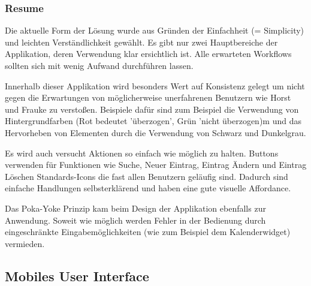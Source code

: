 \subsubsection{Resume}

Die aktuelle Form der L\"osung wurde aus Gründen der Einfachheit (= Simplicity) und leichten Verst\"andlichkeit gew\"ahlt.
Es gibt nur zwei Hauptbereiche der Applikation, deren Verwendung klar ersichtlich ist.
Alle erwarteten Workflows sollten sich mit wenig Aufwand durchf\"uhren lassen.

Innerhalb dieser Applikation wird besonders Wert auf Konsistenz gelegt um nicht gegen die Erwartungen
von m\"oglicherweise unerfahrenen Benutzern wie Horst und Frauke zu versto\ss en. Beispiele daf\"ur sind
zum Beispiel die Verwendung von Hintergrundfarben (Rot bedeutet '\"uberzogen', Gr\"un 'nicht \"uberzogen)m
und das Hervorheben von Elementen durch die Verwendung von Schwarz und Dunkelgrau.

Es wird auch versucht Aktionen so einfach wie m\"oglich zu halten. Buttons verwenden f\"ur Funktionen wie
Suche, Neuer Eintrag, Eintrag \"Andern und Eintrag L\"oschen Standards-Icons die fast allen Benutzern gel\"aufig sind.
Dadurch sind einfache Handlungen selbsterkl\"arend und haben eine gute visuelle Affordance.

Das Poka-Yoke Prinzip kam beim Design der Applikation ebenfalls zur Anwendung. Soweit
wie m\"oglich werden Fehler in der Bedienung durch eingeschr\"ankte Eingabem\"oglichkeiten (wie zum Beispiel dem
Kalenderwidget) vermieden.

\subsection{Mobiles User Interface}

